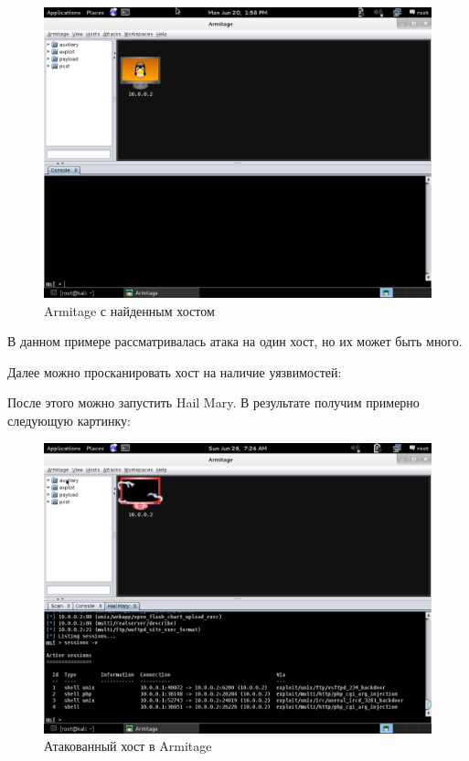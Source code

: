 \documentclass[a4paper]{article}
\begin{document}
\begin{figure}[H]
	\begin{center}
		\includegraphics[scale=0.5]{pics/armitage_host_found.png}
		\caption{Armitage с найденным хостом} 
		\label{pic:pic_name}
	\end{center}
\end{figure}

В данном примере рассматривалась атака на один хост, но их может быть много.

Далее можно просканировать хост на наличие уязвимостей:



После этого можно запустить Hail Mary. В результате получим примерно следующую картинку:

\begin{figure}[H]
	\begin{center}
		\includegraphics[scale=0.5]{pics/armitage_attacked.png}
		\caption{Атакованный хост в Armitage} 
		\label{pic:pic_name}
	\end{center}
\end{figure}
\end{document}
